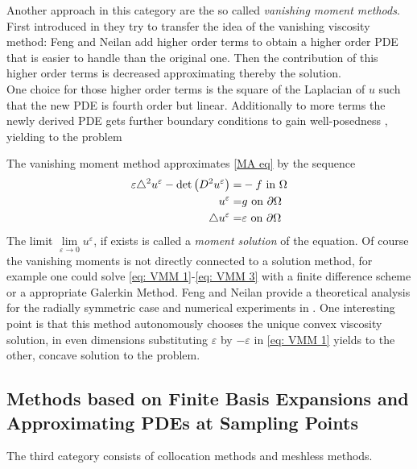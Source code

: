 Another approach in this category are the so called \emph{vanishing moment methods}. First introduced in \cite{FN2009} they try to transfer the idea of the vanishing viscosity method: Feng and Neilan add higher order terms to obtain a higher order PDE that is easier to handle than the original one. Then the contribution of this higher order terms is decreased approximating thereby the \MA solution. \\
One choice for those higher order terms is the square of the Laplacian of $u$ such that the new PDE is fourth order but linear. Additionally to more terms the newly derived PDE gets further boundary conditions to gain well-posedness , yielding to the problem
\begin{definition}
	The vanishing moment method approximates \eqref{MA eq} by the sequence
	\begin{align}
		\varepsilon \triangle^2 u^\varepsilon - \det{\left(D^2 u^\varepsilon\right)} =& -f \text{ in } \Omega \label{eq: VMM 1}\\ 
		u^\varepsilon =& g \text{ on } \partial \Omega \label{eq: VMM 2}\\
		\triangle u^\varepsilon = & \varepsilon \text{ on } \partial \Omega \label{eq: VMM 3}
	\end{align}
The limit $\lim\limits_{\varepsilon \rightarrow 0 } u^\varepsilon$, if exists is called a \emph{moment solution} of the \MA equation.
Of course the vanishing moments is not directly connected to a solution method, for example one could solve \eqref{eq: VMM 1}-\eqref{eq: VMM 3} with a finite difference scheme or a appropriate Galerkin Method.
Feng and Neilan provide a theoretical analysis for the radially symmetric case and numerical experiments in \cite{FN2009, Neilan2010, FN2011a}. One interesting point is that this method autonomously chooses the unique convex viscosity solution, in even dimensions substituting $\varepsilon$ by $-\varepsilon$ in  \eqref{eq: VMM 1} yields to the other, concave solution to the \MA problem.  
\end{definition}


\subsection{Methods based on Finite Basis Expansions and Approximating PDEs at Sampling Points}
The third category consists of collocation methods and meshless methods.

